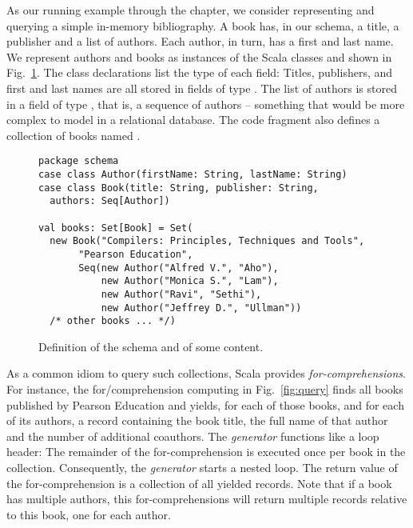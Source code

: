 As our running example through the chapter, we consider representing and querying a simple in-memory bibliography. A book has, in our schema, a title, a publisher and a list of authors. Each author, in turn, has a first and last name. We represent authors and books as instances of the Scala classes  and  shown in Fig.~\ref{fig:schema}. The class declarations list the type of each field: Titles, publishers, and first and last names are all stored in fields of type . The list of authors is stored in a field of type , that is, a sequence of authors -- something that would be more complex to model in a relational database.
The code fragment also defines a collection of books named .
\begin{figure}[htb]
\begin{lstlisting}
package schema
case class Author(firstName: String, lastName: String)
case class Book(title: String, publisher: String,
  authors: Seq[Author])

val books: Set[Book] = Set(
  new Book("Compilers: Principles, Techniques and Tools",
       "Pearson Education",
       Seq(new Author("Alfred V.", "Aho"),
           new Author("Monica S.", "Lam"),
           new Author("Ravi", "Sethi"),
           new Author("Jeffrey D.", "Ullman"))
  /* other books ... */)
\end{lstlisting}
\caption{Definition of the schema and of some content.}
\label{fig:schema}
\end{figure}

As a common idiom to query such collections, Scala provides \emph{for-comprehensions}.
For instance, the for\-/comprehension computing  in Fig.~\ref{fig:query} finds all books published by Pearson Education and yields, for each of those books, and for each of its authors, a record containing the book title, the full name of that author and the number of additional coauthors.
The \emph{generator}  functions like a loop header: The remainder of the for-comprehension is executed once per book in the collection. Consequently, the \emph{generator}  starts a nested loop.
The return value of the for-comprehension is a collection of all yielded
records. Note that if a book has multiple authors, this for-comprehensions will
return multiple records relative to this book, one for each author.

